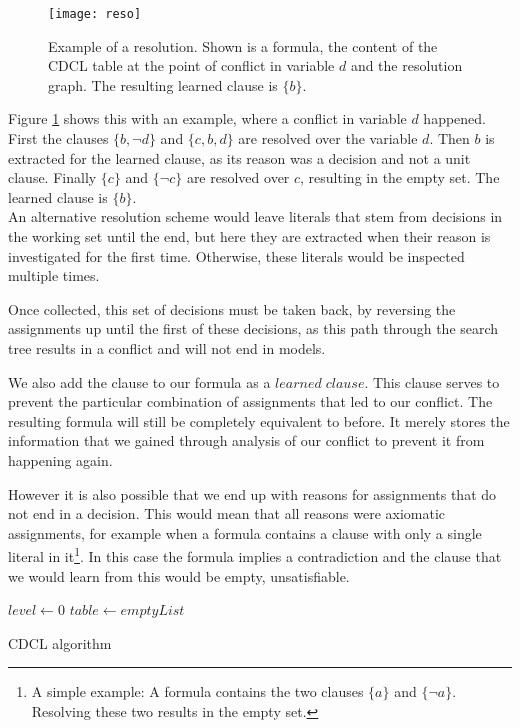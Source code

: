 \begin{figure}[h]
\centering
\texttt{[image: reso]}
\caption{Example of a resolution. Shown is a formula, the content of the CDCL table at the point of conflict in variable $d$ and the resolution graph. The resulting learned clause is $\{b\}$.}
\label{fig:resolution}
\end{figure}

Figure \ref{fig:resolution} shows this with an example, where a conflict in variable $d$ happened. First the clauses $\{b,\neg d\}$ and $\{c,b,d\}$ are resolved over the variable $d$. Then $b$ is extracted for the learned clause, as its reason was a decision and not a unit clause. Finally $\{c\}$ and $\{\neg c\}$ are resolved over $c$, resulting in the empty set. The learned clause is $\{b\}$.\\
An alternative resolution scheme would leave literals that stem from decisions in the working set until the end, but here they are extracted when their reason is investigated for the first time. Otherwise, these literals would be inspected multiple times.

Once collected, this set of decisions must be taken back, by reversing the assignments up until the first of these decisions, as this path through the search tree results in a conflict and will not end in models. 

We also add the clause to our formula as a $learned\; clause$. This clause serves to prevent the particular combination of assignments that led to our conflict. The resulting formula will still be completely equivalent to before. It merely stores the information that we gained through analysis of our conflict to prevent it from happening again.

However it is also possible that we end up with reasons for assignments that do not end in a decision. This would mean that all reasons were axiomatic assignments, for example when a formula contains a clause with only a single literal in it\footnote{A simple example: A formula contains the two clauses $\{a\}$ and $\{\neg a\}$. Resolving these two results in the empty set.}.
In this case the formula implies a contradiction and the clause that we would learn from this would be empty, unsatisfiable.


\begin{algorithm}
\DontPrintSemicolon
{}
$level \gets 0$\;
$table \gets emptyList$\;
\caption{{\sc CDCL algorithm}}
\end{algorithm}

